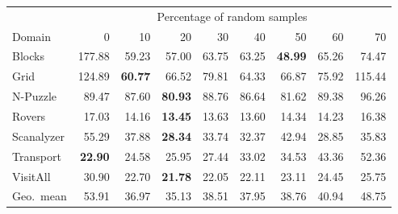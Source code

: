 \begin{tabular}{lrrrrrrrr}
    & \multicolumn{8}{c}{Percentage of random samples} \\
    \cmidrule(lr){2-9}
    Domain & 0 & 10 & 20 & 30 & 40 & 50 & 60 & 70 \\
    \midrule
    Blocks & 177.88 & 59.23 & 57.00 & 63.75 & 63.25 & \textbf{48.99} & 65.26 & 74.47 \\
    Grid & 124.89 & \textbf{60.77} & 66.52 & 79.81 & 64.33 & 66.87 & 75.92 & 115.44 \\
    N-Puzzle & 89.47 & 87.60 & \textbf{80.93} & 88.76 & 86.64 & 81.62 & 89.38 & 96.26 \\
    Rovers & 17.03 & 14.16 & \textbf{13.45} & 13.63 & 13.60 & 14.34 & 14.23 & 16.38 \\
    Scanalyzer & 55.29 & 37.88 & \textbf{28.34} & 33.74 & 32.37 & 42.94 & 28.85 & 35.83 \\
    Transport & \textbf{22.90} & 24.58 & 25.95 & 27.44 & 33.02 & 34.53 & 43.36 & 52.36 \\
    VisitAll & 30.90 & 22.70 & \textbf{21.78} & 22.05 & 22.11 & 23.11 & 24.45 & 25.75 \\
    \midrule
    Geo.~mean & 53.91 & 36.97 & 35.13 & 38.51 & 37.95 & 38.76 & 40.94 & 48.75 \\
\end{tabular}
